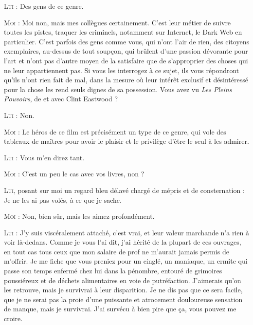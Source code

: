 \begin{dialogue}
\textsc{Lui} : Des gens de ce genre.

\textsc{Moi} : Moi non, mais mes collègues certainement. C’est leur métier de suivre toutes les pistes, traquer les criminels, notamment sur Internet, le Dark Web en particulier. C’est parfois des gens comme vous, qui n’ont l’air de rien, des citoyens exemplaires, au-dessus de tout soupçon, qui brûlent d’une passion dévorante pour l’art et n’ont pas d’autre moyen de la satisfaire que de s’approprier des choses qui ne leur appartiennent pas. Si vous les interrogez à ce sujet, ils vous répondront qu’ils n’ont rien fait de mal, dans la mesure où leur intérêt exclusif et désintéressé pour la chose les rend seuls dignes de sa possession. Vous avez vu \textit{Les Pleins Pouvoirs}, de et avec Clint Eastwood ?

\textsc{Lui} : Non.

\textsc{Moi} : Le héros de ce film est précisément un type de ce genre, qui vole des tableaux de maîtres pour avoir le plaisir et le privilège d’être le seul à les admirer.

\textsc{Lui} : Vous m’en direz tant.

\textsc{Moi} : C’est un peu le cas avec vos livres, non ?

\textsc{Lui}, posant sur moi un regard bleu délavé chargé de mépris et de consternation : Je ne les ai pas volés, à ce que je sache.

\textsc{Moi} : Non, bien sûr, mais les aimez profondément.

\textsc{Lui} : J’y suis viscéralement attaché, c’est vrai, et leur valeur marchande n’a rien à voir là-dedans. Comme je vous l’ai dit, j’ai hérité de la plupart de ces ouvrages, en tout cas tous ceux que mon salaire de prof ne m’aurait jamais permis de m’offrir. Je me fiche que vous preniez pour un cinglé, un maniaque, un ermite qui passe son temps enfermé chez lui dans la pénombre, entouré de grimoires poussiéreux et de déchets alimentaires en voie de putréfaction. J’aimerais qu’on les retrouve, mais je survivrai à leur disparition. Je ne dis pas que ce sera facile, que je ne serai pas la proie d’une puissante et atrocement douloureuse sensation de manque, mais je survivrai. J’ai survécu à bien pire que ça, vous pouvez me croire.


\end{dialogue}
